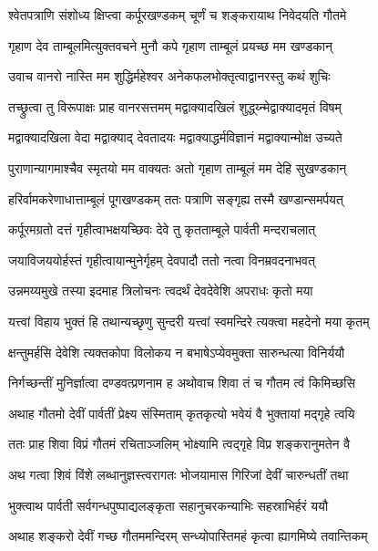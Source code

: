 \twolineshloka
{श्वेतपत्राणि संशोध्य क्षिप्त्वा कर्पूरखण्डकम्}
{चूर्णं च शङ्करायाथ निवेदयति गौतमे}%

\twolineshloka
{गृहाण देव ताम्बूलमित्युक्तवचने मुनौ}
{कपे गृहाण ताम्बूलं प्रयच्छ मम खण्डकान्}%

\twolineshloka
{उवाच वानरो नास्ति मम शुद्धिर्महेश्वर}
{अनेकफलभोक्तृत्वाद्वानरस्तु कथं शुचिः}%

\twolineshloka
{तच्छ्रुत्वा तु विरूपाक्षः प्राह वानरसत्तमम्}
{मद्वाक्यादखिलं शुद्ध्य्न्मेद्वाक्यादमृतं विषम्}%

\twolineshloka
{मद्वाक्यादखिला वेदा मद्वाक्याद् देवतादयः}
{मद्वाक्याद्धर्मविज्ञानं मद्वाक्यान्मोक्ष उच्यते}%

\twolineshloka
{पुराणान्यागमाश्चैव स्मृतयो मम वाक्यतः}
{अतो गृहाण ताम्बूलं मम देहि सुखण्डकान्}%

\twolineshloka
{हरिर्वामकरेणाधात्ताम्बूलं पूगखण्डकम्}
{ततः पत्राणि सङ्गृह्य तस्मै खण्डान्समर्पयत्}%

\twolineshloka
{कर्पूरमग्रतो दत्तं गृहीत्वाभक्षयच्छिवः}
{देवे तु कृतताम्बूले पार्वती मन्दराचलात्}%

\twolineshloka
{जयाविजययोर्हस्तं गृहीत्वायान्मुनेर्गृहम्}
{देवपादौ ततो नत्वा विनम्रवदनाभवत्}%

\twolineshloka
{उन्नमय्यमुखे तस्या इदमाह त्रिलोचनः}
{त्वदर्थं देवदेवेशि अपराधः कृतो मया}%

\twolineshloka
{यत्त्वां विहाय भुक्तं हि तथान्यच्छृणु सुन्दरी}
{यत्त्वां स्वमन्दिरे त्यक्त्वा महदेनो मया कृतम्}%

\twolineshloka
{क्षन्तुमर्हसि देवेशि त्यक्तकोपा विलोकय}
{न बभाषेऽप्येवमुक्ता सारुन्धत्या विनिर्ययौ}%

\twolineshloka
{निर्गच्छन्तीं मुनिर्ज्ञात्वा दण्डवत्प्रणनाम ह}
{अथोवाच शिवा तं च गौतम त्वं किमिच्छसि}%

\twolineshloka
{अथाह गौतमो देवीं पार्वतीं प्रेक्ष्य संस्मिताम्}
{कृतकृत्यो भवेयं वै भुक्तायां मद्गृहे त्वयि}%

\twolineshloka
{ततः प्राह शिवा विप्रं गौतमं रचिताञ्जलिम्}
{भोक्ष्यामि त्वद्गृहे विप्र शङ्करानुमतेन वै}%

\twolineshloka
{अथ गत्वा शिवं विंशे लब्धानुज्ञस्त्वरागतः}
{भोजयामास गिरिजां देवीं चारुन्धतीं तथा}%

\twolineshloka
{भुक्त्वाथ पार्वती सर्वगन्धपुष्पाद्यलङ्कृता}
{सहानुचरकन्याभिः सहस्राभिर्हरं ययौ}%

\twolineshloka
{अथाह शङ्करो देवीं गच्छ गौतममन्दिरम्}
{सन्ध्योपास्तिमहं कृत्वा ह्यागमिष्ये तवान्तिकम्}%

